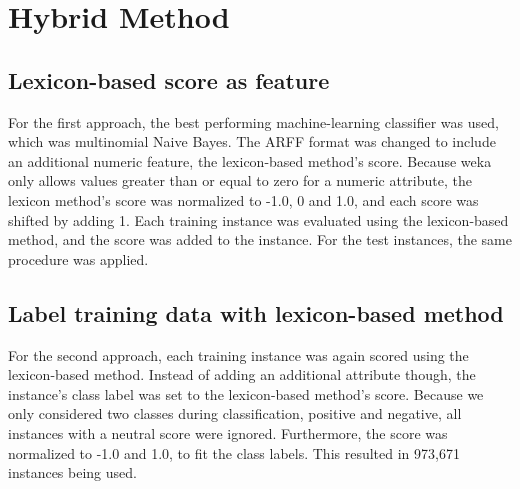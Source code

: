\section{Hybrid Method}

\subsection{Lexicon-based score as feature}
For the first approach, the best performing machine-learning classifier was used, which was multinomial Naive Bayes. The ARFF format was changed to include an additional numeric feature, the lexicon-based method's score. Because weka only allows values greater than or equal to zero for a numeric attribute, the lexicon method's score was normalized to -1.0, 0 and 1.0, and each score was shifted by adding 1. Each training instance was evaluated using the lexicon-based method, and the score was added to the instance. For the test instances, the same procedure was applied.
\subsection{Label training data with lexicon-based method}
For the second approach, each training instance was again scored using the lexicon-based method. Instead of adding an additional attribute though, the instance's class label was set to the lexicon-based method's score. Because we only considered two classes during classification, positive and negative, all instances with a neutral score were ignored. Furthermore, the score was normalized to -1.0 and 1.0, to fit the class labels. This resulted in 973,671 instances being used.



